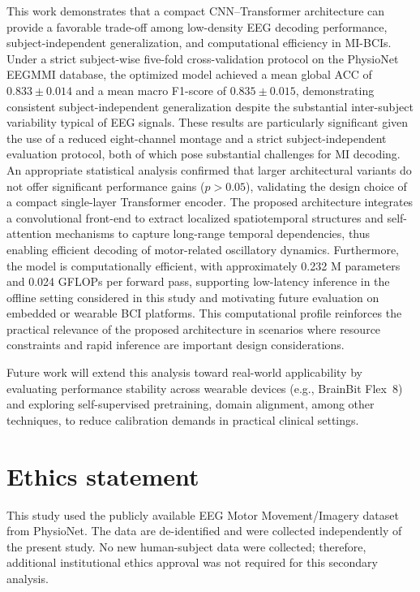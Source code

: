 \documentclass[a4paper,fleqn]{cas-dc}
\begin{document}
This work demonstrates that a compact CNN–Transformer architecture can provide a favorable trade-off among low-density EEG decoding performance, subject-independent generalization, and computational efficiency in MI-BCIs. Under a strict subject-wise five-fold cross-validation protocol on the PhysioNet EEGMMI database, the optimized model achieved a mean global ACC of $0.833 \pm 0.014$ and a mean macro F1-score of $0.835 \pm 0.015$, demonstrating consistent subject-independent generalization despite the substantial inter-subject variability typical of EEG signals. These results are particularly significant given the use of a reduced eight-channel montage and a strict subject-independent evaluation protocol, both of which pose substantial challenges for MI decoding. An appropriate statistical analysis confirmed that larger architectural variants do not offer significant performance gains ($p > 0.05$), validating the design choice of a compact single-layer Transformer encoder. The proposed architecture integrates a convolutional front-end to extract localized spatiotemporal structures and self-attention mechanisms to capture long-range temporal dependencies, thus enabling efficient decoding of motor-related oscillatory dynamics. Furthermore, the model is computationally efficient, with approximately 0.232 M parameters and 0.024 GFLOPs per forward pass, supporting low-latency inference in the offline setting considered in this study and motivating future evaluation on embedded or wearable BCI platforms. This computational profile reinforces the practical relevance of the proposed architecture in scenarios where resource constraints and rapid inference are important design considerations.

Future work will extend this analysis toward real-world applicability by evaluating performance stability across wearable devices (e.g., BrainBit Flex~8) and exploring self-supervised pretraining, domain alignment, among other techniques, to reduce calibration demands in practical clinical settings.

\section*{Ethics statement}
This study used the publicly available EEG Motor Movement/Imagery dataset from PhysioNet. The data are de-identified and were collected independently of the present study. No new human-subject data were collected; therefore, additional institutional ethics approval was not required for this secondary analysis.
\end{document}
